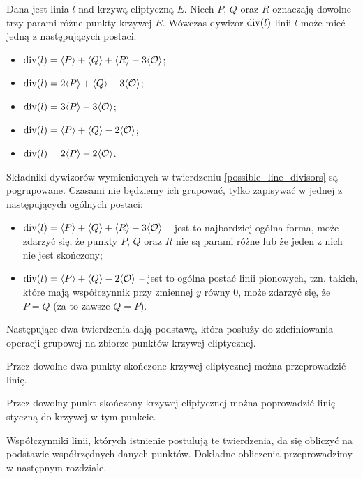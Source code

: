 \begin{theorem}\label{possible_line_divisors}
Dana jest linia $l$ nad krzywą eliptyczną $E$.
Niech $P$, $Q$ oraz $R$ oznaczają dowolne trzy parami różne punkty krzywej $E$.
Wówczas dywizor $\operatorname{div}(l)$ linii $l$ może mieć jedną z następujących postaci:
\begin{itemize}
\item $\operatorname{div}(l) = \langle P\rangle + \langle Q\rangle + \langle R\rangle - 3\langle\mathcal{O}\rangle$;
\item $\operatorname{div}(l) = 2\langle P\rangle + \langle Q\rangle - 3\langle\mathcal{O}\rangle$;
\item $\operatorname{div}(l) = 3\langle P\rangle - 3\langle\mathcal{O}\rangle$;
\item $\operatorname{div}(l) = \langle P\rangle + \langle Q\rangle - 2\langle\mathcal{O}\rangle$;
\item $\operatorname{div}(l) = 2\langle P\rangle - 2\langle\mathcal{O}\rangle$.
\end{itemize}
\end{theorem}

\begin{remark}
Składniki dywizorów wymienionych w twierdzeniu \ref{possible_line_divisors}
są pogrupowane. Czasami nie będziemy ich grupować,
tylko zapisywać w jednej z następujących ogólnych postaci:
\begin{itemize}
\item $\operatorname{div}(l) = \langle P\rangle + \langle Q\rangle + \langle R\rangle - 3\langle\mathcal{O}\rangle$ --
jest to najbardziej ogólna forma,
może zdarzyć się, że punkty $P$, $Q$ oraz $R$ nie są parami różne
lub że jeden z nich nie jest skończony;
\item $\operatorname{div}(l) = \langle P\rangle + \langle Q\rangle - 2\langle\mathcal{O}\rangle$ --
jest to ogólna postać linii pionowych,
tzn. takich, które mają współczynnik przy zmiennej $y$ równy $0$,
może zdarzyć się, że $P = Q$ (za to zawsze $Q = \overline{P}$).
\end{itemize}
\end{remark}

Następujące dwa twierdzenia dają podstawę,
która posłuży do zdefiniowania operacji grupowej
na zbiorze punktów krzywej eliptycznej.

\begin{theorem}\label{line_through_two_points_theorem}
Przez dowolne dwa punkty skończone krzywej eliptycznej
można przeprowadzić linię.
\end{theorem}

\begin{theorem}\label{line_tangent_at_point_theorem}
Przez dowolny punkt skończony krzywej eliptycznej
można poprowadzić linię
styczną do krzywej w tym punkcie.
\end{theorem}

Współczynniki linii, których istnienie postulują te twierdzenia,
da się obliczyć na podstawie współrzędnych danych punktów.
Dokładne obliczenia przeprowadzimy w następnym rozdziale.
